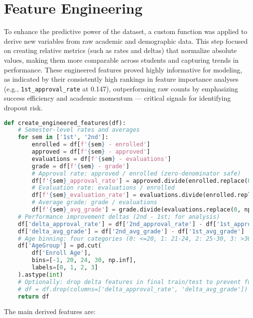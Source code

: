 \documentclass[twoside,final]{hcmut-report}
\begin{document}
\section{Feature Engineering}
To enhance the predictive power of the dataset, a custom function was applied to derive new variables from raw academic and demographic data. This step focused on creating relative metrics (such as rates and deltas) that normalize absolute values, making them more comparable across students and capturing trends in performance. These engineered features proved highly informative for modeling, as indicated by their consistently high rankings in feature importance analyses (e.g., \texttt{1st\_approval\_rate} at 0.147), outperforming raw counts by emphasizing success efficiency and academic momentum — critical signals for identifying dropout risk.
\begin{lstlisting}[language=python]
def create_engineered_features(df):
    # Semester-level rates and averages
    for sem in ['1st', '2nd']:
        enrolled = df[f'{sem} - enrolled']
        approved = df[f'{sem} - approved']
        evaluations = df[f'{sem} - evaluations']
        grade = df[f'{sem} - grade']
        # Approval rate: approved / enrolled (zero-denominator safe)
        df[f'{sem}_approval_rate'] = approved.divide(enrolled.replace(0, np.nan)).fillna(0)
        # Evaluation rate: evaluations / enrolled
        df[f'{sem}_evaluation_rate'] = evaluations.divide(enrolled.replace(0, np.nan)).fillna(0)
        # Average grade: grade / evaluations
        df[f'{sem}_avg_grade'] = grade.divide(evaluations.replace(0, np.nan)).fillna(0)
    # Performance improvement deltas (2nd - 1st; for analysis)
    df['delta_approval_rate'] = df['2nd_approval_rate'] - df['1st_approval_rate']
    df['delta_avg_grade'] = df['2nd_avg_grade'] - df['1st_avg_grade']
    # Age binning: four categories (0: <=20, 1: 21-24, 2: 25-30, 3: >30)
    df['AgeGroup'] = pd.cut(
        df['Enroll Age'],
        bins=[-1, 20, 24, 30, np.inf],
        labels=[0, 1, 2, 3]
    ).astype(int)
    # Optionally: drop delta features in final train/test to prevent future-data leakage
    # df = df.drop(columns=['delta_approval_rate', 'delta_avg_grade'])
    return df
\end{lstlisting}
The main derived features are:
\end{document}
